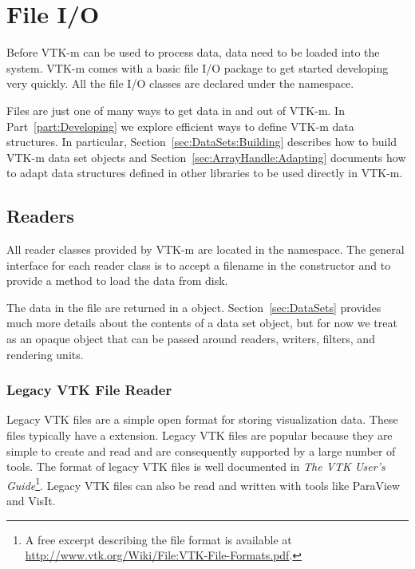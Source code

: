 \chapter{File I/O}
\label{chap:FileIO}


Before VTK-m can be used to process data, data need to be loaded into the
system. VTK-m comes with a basic file I/O package to get started developing
very quickly. All the file I/O classes are declared under the \vtkmio{}
namespace.

\begin{didyouknow}
  Files are just one of many ways to get data in and out of VTK-m. In
  Part~\ref{part:Developing} we explore efficient ways to define VTK-m data
  structures. In particular, Section~\ref{sec:DataSets:Building} describes
  how to build VTK-m data set objects and
  Section~\ref{sec:ArrayHandle:Adapting} documents how to adapt data
  structures defined in other libraries to be used directly in VTK-m.
\end{didyouknow}

\section{Readers}


All reader classes provided by VTK-m are located in the \vtkmioreader{}
namespace. The general interface for each reader class is to accept a
filename in the constructor and to provide a  method
to load the data from disk.

The data in the file are returned in a  object.
Section~\ref{sec:DataSets} provides much more details about the contents of
a data set object, but for now we treat  as an
opaque object that can be passed around readers, writers, filters, and
rendering units.

\subsection{Legacy VTK File Reader}

Legacy VTK files are a simple open format for storing visualization data.
These files typically have a  extension. Legacy VTK
files are popular because they are simple to create and read and are
consequently supported by a large number of tools. The format of legacy VTK
files is well documented in \textit{The VTK User's Guide}\footnote{A free
  excerpt describing the file format is available at
  \url{http://www.vtk.org/Wiki/File:VTK-File-Formats.pdf}.}. Legacy VTK
files can also be read and written with tools like ParaView and VisIt.

